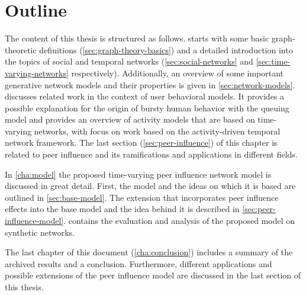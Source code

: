 

\section{Outline}
\label{sec:outline}

The content of this thesis is structured as follows.
 starts with some basic graph-theoretic definitions (\cref{sec:graph-theory-basics}) and a detailed introduction into the topics of social and temporal networks (\cref{sec:social-networks} and \cref{sec:time-varying-networks} respectively).
Additionally, an overview of some important generative network models and their properties is given in \cref{sec:network-models}.
  discusses related work in the context of user behavioral models.
 It provides a possible explanation for the origin of bursty human behavior with the queuing model and provides an overview of activity models that are based on time-varying networks, with focus on work based on the activity-driven temporal network framework.
The last section (\cref{sec:peer-influence}) of this chapter is related to peer influence and its ramifications and applications in different fields.

In \cref{cha:model} the proposed time-varying peer influence network model is discussed in great detail.
First, the model and the ideas on which it is based are outlined in \cref{sec:base-model}.
The extension that incorporates peer influence effects into the base model and the idea behind it is described in \cref{sec:peer-influence-model}.
 contains the evaluation and analysis of the proposed model on synthetic networks.

The last chapter of this document (\cref{cha:conclusion}) includes a summary of the archived results and a conclusion.
Furthermore, different applications and possible extensions of the peer influence model are discussed in the last section of this thesis.
